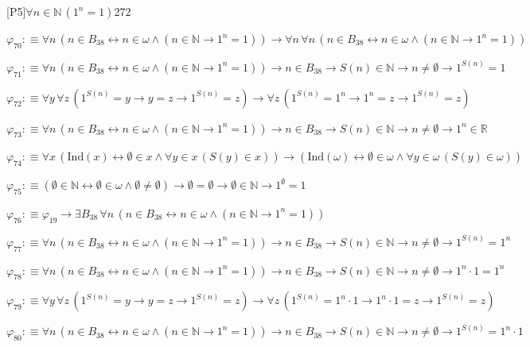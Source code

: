 \begin{fullproof}{[P5]}{$\forall n \in \mathbb{N}\,({{1}^{n}} = 1)$}{272}
\begin{abbrevlist}
\item $\varphi_{70} :\equiv \forall n\,(n \in B_{38} \leftrightarrow n \in \omega \land (n \in \mathbb{N} \to {{1}^{n}} = 1)) \to \forall n\,\forall n\,(n \in B_{38} \leftrightarrow n \in \omega \land (n \in \mathbb{N} \to {{1}^{n}} = 1))$
\item $\varphi_{71} :\equiv \forall n\,(n \in B_{38} \leftrightarrow n \in \omega \land (n \in \mathbb{N} \to {{1}^{n}} = 1)) \to n \in B_{38} \to S(n) \in \mathbb{N} \to n \neq \emptyset \to {{1}^{S(n)}} = 1$
\item $\varphi_{72} :\equiv \forall y\,\forall z\,({{1}^{S(n)}} = y \to y = z \to {{1}^{S(n)}} = z) \to \forall z\,({{1}^{S(n)}} = {{1}^{n}} \to {{1}^{n}} = z \to {{1}^{S(n)}} = z)$
\item $\varphi_{73} :\equiv \forall n\,(n \in B_{38} \leftrightarrow n \in \omega \land (n \in \mathbb{N} \to {{1}^{n}} = 1)) \to n \in B_{38} \to S(n) \in \mathbb{N} \to n \neq \emptyset \to {{1}^{n}} \in \mathbb{R}$
\item $\varphi_{74} :\equiv \forall x\,(\mathrm{Ind}(x) \leftrightarrow \emptyset \in x \land \forall y \in x\,(S(y) \in x)) \to (\mathrm{Ind}(\omega) \leftrightarrow \emptyset \in \omega \land \forall y \in \omega\,(S(y) \in \omega))$
\item $\varphi_{75} :\equiv (\emptyset \in \mathbb{N} \leftrightarrow \emptyset \in \omega \land \emptyset \neq \emptyset) \to \emptyset = \emptyset \to \emptyset \in \mathbb{N} \to {{1}^{\emptyset}} = 1$
\item $\varphi_{76} :\equiv \varphi_{19} \to \exists B_{38}\,\forall n\,(n \in B_{38} \leftrightarrow n \in \omega \land (n \in \mathbb{N} \to {{1}^{n}} = 1))$
\item $\varphi_{77} :\equiv \forall n\,(n \in B_{38} \leftrightarrow n \in \omega \land (n \in \mathbb{N} \to {{1}^{n}} = 1)) \to n \in B_{38} \to S(n) \in \mathbb{N} \to n \neq \emptyset \to {{1}^{S(n)}} = {{1}^{n}}$
\item $\varphi_{78} :\equiv \forall n\,(n \in B_{38} \leftrightarrow n \in \omega \land (n \in \mathbb{N} \to {{1}^{n}} = 1)) \to n \in B_{38} \to S(n) \in \mathbb{N} \to n \neq \emptyset \to {{1}^{n}} \cdot 1 = {{1}^{n}}$
\item $\varphi_{79} :\equiv \forall y\,\forall z\,({{1}^{S(n)}} = y \to y = z \to {{1}^{S(n)}} = z) \to \forall z\,({{1}^{S(n)}} = {{1}^{n}} \cdot 1 \to {{1}^{n}} \cdot 1 = z \to {{1}^{S(n)}} = z)$
\item $\varphi_{80} :\equiv \forall n\,(n \in B_{38} \leftrightarrow n \in \omega \land (n \in \mathbb{N} \to {{1}^{n}} = 1)) \to n \in B_{38} \to S(n) \in \mathbb{N} \to n \neq \emptyset \to {{1}^{S(n)}} = {{1}^{n}} \cdot 1$

\end{abbrevlist}
\end{fullproof}
